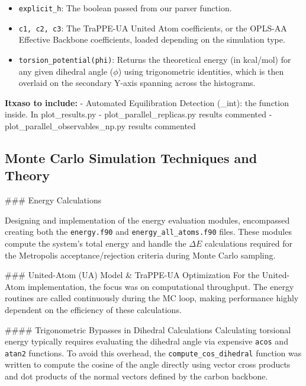 \documentclass[
]{article}
\providecommand{\tightlist}{%
  \setlength{\itemsep}{0pt}\setlength{\parskip}{0pt}}
\begin{document}
\begin{itemize}
\tightlist
\item
  \texttt{explicit\_h}: The boolean passed from our parser function.
\item
  \texttt{c1,\ c2,\ c3}: The TraPPE-UA United Atom coefficients, or the
  OPLS-AA Effective Backbone coefficients, loaded depending on the
  simulation type.
\item
  \texttt{torsion\_potential(phi)}: Returns the theoretical energy (in
  kcal/mol) for any given dihedral angle (\(\phi\)) using trigonometric
  identities, which is then overlaid on the secondary Y-axis spanning
  across the histograms.
\end{itemize}

\textbf{Itxaso to include:} - Automated Equilibration Detection
(\tau\_int): the function inside. In plot\_results.py -
⁠plot\_parallel\_replicas.py results commented -
⁠plot\_parallel\_observables\_np.py results commented

\subsection{Monte Carlo Simulation Techniques and
Theory}\label{monte-carlo-simulation-techniques-and-theory}

\#\#\# Energy Calculations

Designing and implementation of the energy evaluation modules,
encompassed creating both the \texttt{energy.f90} and
\texttt{energy\_all\_atoms.f90} files. These modules compute the
system's total energy and handle the \(\Delta E\) calculations required
for the Metropolis acceptance/rejection criteria during Monte Carlo
sampling.

\#\#\# United-Atom (UA) Model \& TraPPE-UA Optimization For the
United-Atom implementation, the focus was on computational throughput.
The energy routines are called continuously during the MC loop, making
performance highly dependent on the efficiency of these calculations.

\#\#\#\# Trigonometric Bypasses in Dihedral Calculations Calculating
torsional energy typically requires evaluating the dihedral angle via
expensive \texttt{acos} and \texttt{atan2} functions. To avoid this
overhead, the \texttt{compute\_cos\_dihedral} function was written to
compute the cosine of the angle directly using vector cross products and
dot products of the normal vectors defined by the carbon backbone.
\end{document}
